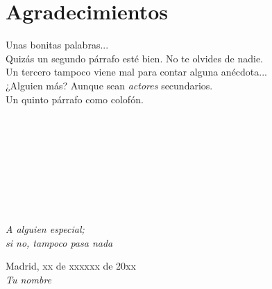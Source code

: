 \cleardoublepage

\chapter*{Agradecimientos}

Unas bonitas palabras...\\

Quizás un segundo párrafo esté bien. No te olvides de nadie.\\

Un tercero tampoco viene mal para contar alguna anécdota...\\

¿Alguien más? Aunque sean \textit{actores} secundarios.\\

Un quinto párrafo como colofón.\\
\ %

\

\

\

\

\begin{flushright}
		\vspace{4.0 cm}
		\emph{A alguien especial;\\
      si no, tampoco pasa nada}\\
		\par
		\vspace{1.0 cm}
		Madrid, xx de xxxxxx de 20xx\\ %
		\emph{Tu nombre}
\end{flushright}

\thispagestyle{empty}

